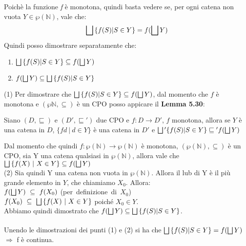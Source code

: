 {    Poichè la funzione \textit{f} è monotona, quindi basta vedere se, per ogni
    catena non vuota $Y\in\wp{(\mathbb{N})}$, vale che:
    \[\bigsqcup{} \{f(S) | S \in{}Y\} = f(\bigsqcup{}Y)\]
    Quindi posso dimostrare separatamente che:
    \begin{enumerate}
    \item $\bigsqcup{} \{f(S) | S \in{}Y\} \subseteq f(\bigsqcup{}Y)$
    \item $f(\bigsqcup{}Y) \subseteq \bigsqcup{} \{f(S) | S \in{}Y\}$
    \end{enumerate}

    (1) Per dimostrare che $\bigsqcup{} \{f(S) | S \in{}Y\} \subseteq{} 
    f(\bigsqcup{}Y)$, dal momento che $f$ è monotona e 
    $(\wp{\mathbb{N}}, \subseteq{})$ è un CPO posso appicare il 
    \textbf{Lemma 5.30}:\\
    \begin{customlem}{5.30}
    Siano $(D, \sqsubseteq)$ e $(D', \sqsubseteq{}')$ due CPO e 
    $f:D\rightarrow{}D'$, $f$ monotona, allora se $Y$ è una catena in $D$, 
    $\{fd~|~d\in{}Y\}$ è una catena in $D'$ e $\bigsqcup{}' \{f(S) | S \in{}Y\} 
    \sqsubseteq{}' f(\bigsqcup{}Y)$
    \end{customlem}
    Dal momento che quindi $f:\wp{(\mathbb{N})}\rightarrow{}\wp{(\mathbb{N})}$
    è monotona, $(\wp{(\mathbb{N})}, \subseteq)$ è un CPO, sia Y una catena
    qualsiasi in $\wp{(\mathbb{N})}$, allora vale che $\bigsqcup{}\{f(X)~|~X\in{}Y\}
    \subseteq{}f(\bigsqcup{}Y)$\\
    
    (2) Sia quindi Y una catena non vuota in $\wp{(\mathbb{N})}$. Allora il lub
    di Y è il più grande elemento in $Y$, che chiamiamo $X_0$. Allora:\\
    \hspace*{1.5cm}$f(\bigsqcup{}Y)~\subseteq~f(X_0)$ (per~definizione~di~$X_0$)\\
    \hspace*{1.5cm}$f(X_0)~\subseteq~\bigsqcup{}\{f(X)~|~X\in{}Y\}$ poiché $X_0\in{}
    Y$.\\
    Abbiamo quindi dimostrato che $f(\bigsqcup{}Y) \subseteq \bigsqcup{} \{f(S) | S
    \in{}Y\}$.\\ \\
    
    Unendo le dimostrazioni dei punti (1) e (2) si ha che $\bigsqcup{} \{f(S) | S
    \in{}Y\} = f(\bigsqcup{}Y)$ $\Rightarrow$ f è continua.

%
}
\newpage